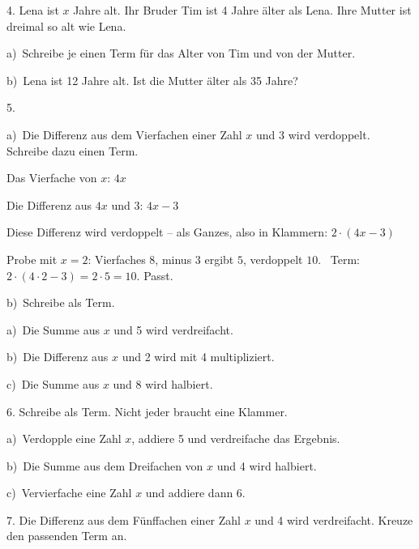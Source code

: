 \documentclass[11pt]{article}
\newcommand{\grau}[1]{{\color{mbgrau}#1}}
\begin{document}
\begin{pfaufg}{}{4.}{}
Lena ist $x$ Jahre alt. Ihr Bruder Tim ist 4 Jahre älter als Lena. Ihre Mutter ist dreimal so alt wie Lena. \par a)~Schreibe je einen Term für das Alter von Tim und von der Mutter. \par b)~Lena ist 12 Jahre alt. Ist die Mutter älter als 35 Jahre?
\end{pfaufg}

\begin{pfaufg}{}{5.}{}
\grau{a)\ Die Differenz aus dem Vierfachen einer Zahl $x$ und 3 wird verdoppelt. Schreibe dazu einen Term.\par\smallskip Das Vierfache von $x$: \quad $4x$\par Die Differenz aus $4x$ und 3: \quad $4x - 3$\par Diese Differenz wird verdoppelt – als Ganzes, also in Klammern: \quad $2 \cdot (4x - 3)$\par Probe mit $x = 2$: Vierfaches $8$, minus 3 ergibt $5$, verdoppelt $10$. \ Term: $2 \cdot (4 \cdot 2 - 3) = 2 \cdot 5 = 10$. Passt.}
\par\medskip
b)\ Schreibe als Term. \par a)~Die Summe aus $x$ und 5 wird verdreifacht. \par b)~Die Differenz aus $x$ und 2 wird mit 4 multipliziert. \par c)~Die Summe aus $x$ und 8 wird halbiert.
\end{pfaufg}

\begin{pfaufg}{}{6.}{}
Schreibe als Term. Nicht jeder braucht eine Klammer. \par a)~Verdopple eine Zahl $x$, addiere 5 und verdreifache das Ergebnis. \par b)~Die Summe aus dem Dreifachen von $x$ und 4 wird halbiert. \par c)~Vervierfache eine Zahl $x$ und addiere dann 6.
\end{pfaufg}

\begin{pfaufg}{}{7.}{}
Die Differenz aus dem Fünffachen einer Zahl $x$ und 4 wird verdreifacht. Kreuze den passenden Term an.\par\smallskip {}\par {}
\end{pfaufg}
\end{document}
